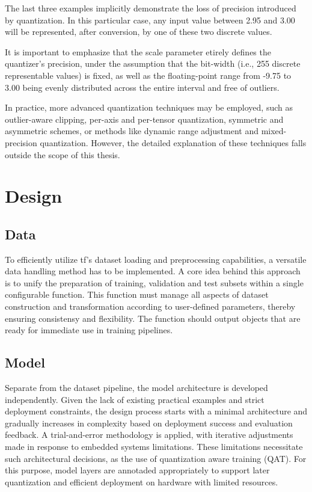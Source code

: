 {The last three examples implicitly 	demonstrate the loss of precision introduced by quantization. In this particular case, any input value between 2.95 and 3.00 will be represented, after conversion, by one of these two discrete values.

It is important to emphasize that the scale parameter etirely defines the quantizer's precision, under the assumption that the bit-width (i.e., 255 discrete representable values) is fixed, as well as the floating-point range from -9.75 to 3.00 being evenly distributed across the entire interval and free of outliers.

In practice, more advanced quantization techniques may be employed, such as outlier-aware clipping, per-axis and per-tensor quantization, symmetric and asymmetric schemes, or methods like dynamic range adjustment and mixed-precision quantization. However, the detailed explanation of these techniques falls outside the scope of this thesis.


\section{Design}

\subsection{Data}

To efficiently utilize \gls{tf}'s dataset loading and preprocessing capabilities, a versatile data handling method has to be implemented. A core idea behind this approach is to unify the preparation of training, validation and test subsets within a single configurable function. This function must manage all aspects of dataset construction and transformation according to user-defined parameters, thereby ensuring consistensy and flexibility. The function should output  objects \cite{tfDataset} that are ready for immediate use in training pipelines. \cite{tfPaper}

\subsection{Model}

Separate from the dataset pipeline, the model architecture is developed independently. Given the lack of existing practical examples and strict deployment constraints, the design process starts with a minimal architecture and gradually increases in complexity based on deployment success and evaluation feedback. A trial-and-error methodology is applied, with iterative adjustments made in response to embedded systems limitations. These limitations necessitate such architectural decisions, as the use of quantization aware training (QAT). For this purpose, model layers are annotaded appropriately to support later quantization and efficient deployment on hardware with limited resources.

}
